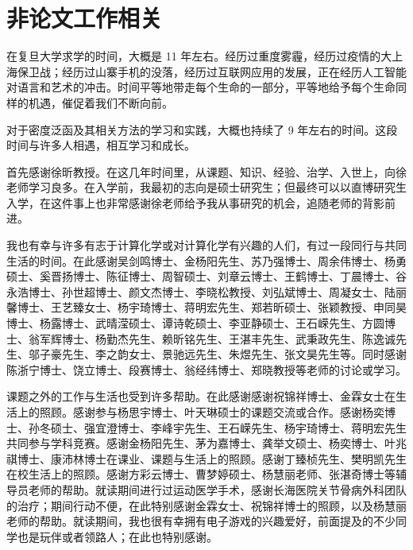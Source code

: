 \section*{非论文工作相关}
\label{sec.finale.acknoledge}

在复旦大学求学的时间，大概是 11 年左右。经历过重度雾霾，经历过疫情的大上海保卫战；经历过山寨手机的没落，经历过互联网应用的发展，正在经历人工智能对语言和艺术的冲击。时间平等地带走每个生命的一部分，平等地给予每个生命同样的机遇，催促着我们不断向前。

对于密度泛函及其相关方法的学习和实践，大概也持续了 9 年左右的时间。这段时间与许多人相遇，相互学习和成长。

首先感谢徐昕教授。在这几年时间里，从课题、知识、经验、治学、入世上，向徐老师学习良多。在入学前，我最初的志向是硕士研究生；但最终可以以直博研究生入学，在这件事上也非常感谢徐老师给予我从事研究的机会，追随老师的背影前进。

我也有幸与许多有志于计算化学或对计算化学有兴趣的人们，有过一段同行与共同生活的时间。在此感谢吴剑鸣博士、金杨阳先生、苏乃强博士、周余伟博士、杨勇硕士、奚晋扬博士、陈征博士、周智硕士、刘章云博士、王鹤博士、丁晨博士、谷永浩博士、孙世超博士、颜文杰博士、李晓松教授、刘弘斌博士、周凝女士、陆丽馨博士、王艺臻女士、杨宇琦博士、蒋明宏先生、郑若昕硕士、张颖教授、申同昊博士、杨露博士、武晴滢硕士、谭诗乾硕士、李亚静硕士、王石嵘先生、方圆博士、翁军辉博士、杨勤杰先生、赖昕铭先生、王湛丰先生、武秉政先生、陈逸诚先生、邬子豪先生、李之韵女士、景驰远先生、朱煜先生、张文昊先生等。同时感谢陈浙宁博士、饶立博士、段赛博士、翁经纬博士、郑晓教授等老师的讨论或学习。

课题之外的工作与生活也受到许多帮助。在此感谢感谢祝锦祥博士、金霖女士在生活上的照顾。感谢参与杨思宇博士、叶天琳硕士的课题交流或合作。感谢杨奕博士、孙冬硕士、强宜澄博士、李峰宇先生、王石嵘先生、杨宇琦博士、蒋明宏先生共同参与学科竞赛。感谢金杨阳先生、茅为嘉博士、龚举文硕士、杨奕博士、叶兆祺博士、康沛林博士在课业、课题与生活上的照顾。感谢丁臻桢先生、樊明凯先生在校生活上的照顾。感谢方彩云博士、曹梦婷硕士、杨慧丽老师、张湛奇博士等辅导员老师的帮助。就读期间进行过运动医学手术，感谢长海医院关节骨病外科团队的治疗；期间行动不便，在此特别感谢金霖女士、祝锦祥博士的照顾，以及杨慧丽老师的帮助。就读期间，我也很有幸拥有电子游戏的兴趣爱好，前面提及的不少同学也是玩伴或者领路人；在此也特别感谢。
